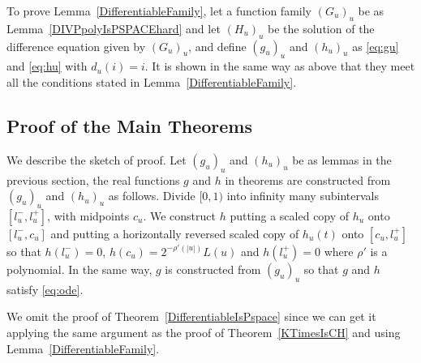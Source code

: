 


 To prove Lemma~\ref{DifferentiableFamily}, 
 let a function family $(G_u)_u$ be as Lemma~\ref{DIVPpolyIsPSPACEhard}
 and let $(H_u)_u$ be the solution of the difference equation given by $(G_u)_u$,
 and define $(g_u)_u$ and $(h_u)_u$ as \eqref{eq:gu} and \eqref{eq:hu}
 with $d_u(i) = i$.
 It is shown in the same way as above that they meet all the conditions
 stated in Lemma~\ref{DifferentiableFamily}.


\subsection{Proof of the Main Theorems}
\label{subsection: proof of theorems}
We describe the sketch of proof.
Let $(g_u)_u$ and $(h_u)_u$ be as lemmas in the previous section,
the real functions $g$ and $h$ in theorems are constructed from $(g_u)_u$ and $(h_u)_u$ as follows.
Divide $[0,1)$ into infinity many subintervals $[l^-_u, l^+_u]$,
with midpoints $c_u$.
We construct $h$ putting a scaled copy of $h_u$ onto $[l^-_u, c_u]$ and
putting a horizontally reversed scaled copy of $h_u(t)$ onto $[c_u, l^+_u]$ 
so that $h(l^-_u) = 0$, $h(c_u) = 2^{-\rho'(|u|)} L(u)$ and $h(l^+_u) = 0$ where $\rho'$ is a polynomial.
In the same way, $g$ is constructed from $(g_u)_u$ so that $g$ and $h$ satisfy \eqref{eq:ode}.

We omit the proof of Theorem~\ref{DifferentiableIsPspace} 
since we can get it applying the same argument as the proof of Theorem~\ref{KTimesIsCH} and using Lemma~\ref{DifferentiableFamily}.


